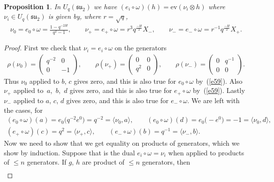 \documentclass[pdftex]{sigma}
\numberwithin{equation}{section}
\newtheorem{Proposition}[Theorem]{Proposition}
 { \theoremstyle{definition}
\newtheorem{Definition}[Theorem]{Definition}
\newtheorem{Note}[Theorem]{Note}
\newtheorem{Example}[Theorem]{Example}
\newtheorem{Remark}[Theorem]{Remark} }
\newcommand{\ev}{\mathrm{ev}}
\newcommand{\tens}{\mathop{\otimes}}
\newcommand{\<}{\langle}
\renewcommand{\>}{\rangle}
\begin{document}
\begin{Proposition}\label{P5}
	In $ U_{q}({\mathfrak{su}}_{2}) $ we have $ (e_{i}\circ \omega )(h) =	\ev (\nu_{i} \tens h)$ where $ \nu_{i} \in U_{q}({\mathfrak{su}}_{2}) $ is given by, where $ r=\sqrt{q} $,
	\begin{gather*}
		\nu_{0}=e_{0}\circ \omega=\frac{1-q^{-2H}}{q^{2}-1}, \qquad \nu_{+}=e_{+}\circ\omega= r^{3} q^{\frac{-H}{2}} X_{-}, \qquad 	\nu_{-}=e_{-}\circ \omega= r^{-1}q^{\frac{-H}{2}} X_{+}.
	\end{gather*}
\end{Proposition}
\begin{proof}
	First we check that $\nu_{i}=e_{i}\circ \omega $ on the generators
		\begin{gather*}%
		\rho (\nu_{0})= \left( \begin{matrix}
		q^{-2}& 0\\
			0& -1
		\end{matrix} \right), \qquad\rho (\nu _{+} )= \left( \begin{matrix}
			0& 0 \\
			q^{2}& 0
		\end{matrix} \right), \qquad \rho (\nu_{-})= \left( \begin{matrix}
			0& q^{-1} \\
			0& 0
		\end{matrix} \right)  .
	\end{gather*}
Thus $ \nu_{0} $ applied to $ b$, $c $ gives zero, and this is also true for $ e_{0}\circ\omega$ by~(\ref{e59}).
Also $ \nu_{+} $ applied to~$a$,~$b$,~$d $ gives zero, and this is also true for $ e_{+}\circ \omega$ by~(\ref{e59}). Lastly $ \nu_{-} $ applied to $a$, $c$, $d $ gives zero, and this is also true for $ e_{-}\circ \omega$. We are left with the cases, for
\begin{gather}
		(e_{0}\circ\omega)(a)=e_{0}\big(q^{-2} e^{0}\big)= q^{-2}= \langle \nu_{0}, a \rangle, \qquad
	(e_{0}\circ\omega)(d)=e_{0}\big({-}e^{0}\big)= -1= \langle \nu_{0}, d \rangle,\nonumber\\
	(	e_{+}\circ\omega)(c)= q^{2}= \langle \nu_{+},c\rangle, \qquad
	(e_{-}\circ\omega)(b)= q^{-1}= \langle \nu_{-},b \rangle .\label{e62}
\end{gather}
Now we need to show that we get equality on products of generators, which we show by induction. Suppose that is the dual $ e_{i} \circ \omega =\nu_{i}$ when applied to products of $ \leq n $ generators.
If $ g$, $h $ are product of $ \leq n $ generators, then
\begin{gather*}

\end{gather*}
\end{proof}
\end{document}
